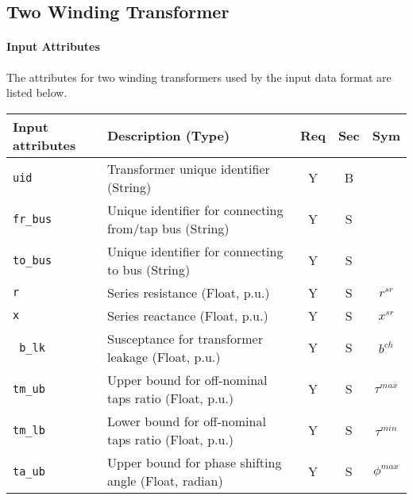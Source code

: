\documentclass{article}
\begin{document}
\subsection{Two Winding Transformer}
\label{nom:transformer}

\paragraph{Input Attributes}
The attributes for two winding transformers used by the
input data format are listed below.

\begin{center}
\small
\begin{tabular}{ l | l | c | c | c |}
Input attributes & Description (Type) & Req & Sec & Sym\\
\hline
  {\tt uid} & Transformer unique identifier (String)& Y & B & \\
  {\tt fr\_bus} & Unique identifier for connecting from/tap bus (String)& Y & S & \\
  {\tt to\_bus} & Unique identifier for connecting to bus (String)& Y & S & \\
  {\tt r} & Series resistance (Float, p.u.)& Y & S & $r^{sr}$\\
  {\tt x} & Series reactance  (Float, p.u.)& Y & S & $x^{sr}$\\
  {\tt\color{red} b\_lk} & Susceptance for transformer leakage (Float, p.u.)& Y & S & $b^{ch}$ \\
  {\tt tm\_ub} & Upper bound for off-nominal taps ratio (Float, p.u.)& Y & S & $\tau^{max}$\\
  {\tt tm\_lb} & Lower bound for off-nominal taps ratio (Float, p.u.)& Y & S & $\tau^{min}$\\
  {\tt ta\_ub} & Upper bound for phase shifting angle (Float, radian)& Y & S & $\phi^{max}$\\

\end{tabular}
\end{center}
\end{document}
